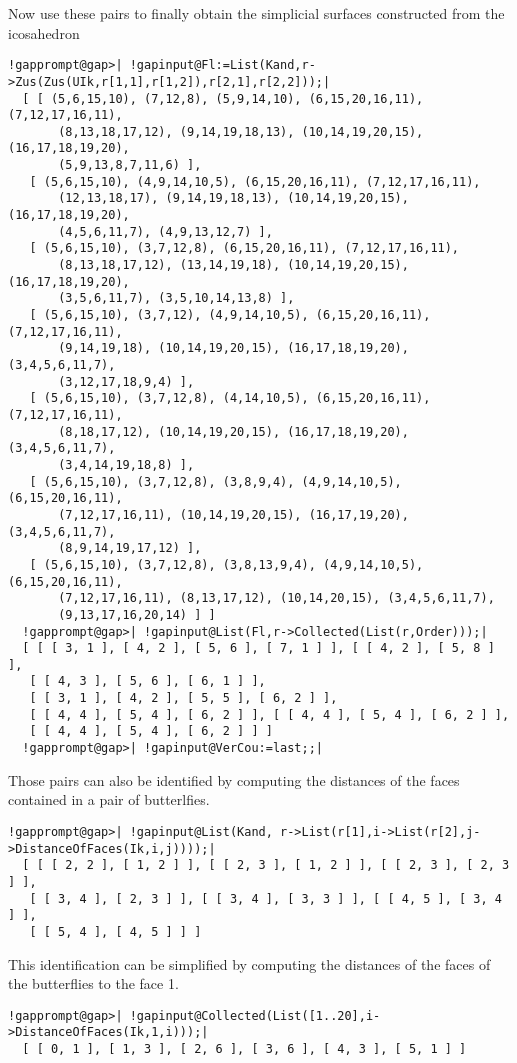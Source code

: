 \documentclass[a4paper,11pt]{report}
\begin{document}
{{ Now use these pairs to finally obtain the simplicial surfaces constructed from
the icosahedron 

 
\begin{Verbatim}[commandchars=!@|,fontsize=\small,frame=single,label=Example]
  !gapprompt@gap>| !gapinput@Fl:=List(Kand,r->Zus(Zus(UIk,r[1,1],r[1,2]),r[2,1],r[2,2]));|
  [ [ (5,6,15,10), (7,12,8), (5,9,14,10), (6,15,20,16,11), (7,12,17,16,11), 
       (8,13,18,17,12), (9,14,19,18,13), (10,14,19,20,15), (16,17,18,19,20), 
       (5,9,13,8,7,11,6) ], 
   [ (5,6,15,10), (4,9,14,10,5), (6,15,20,16,11), (7,12,17,16,11), 
       (12,13,18,17), (9,14,19,18,13), (10,14,19,20,15), (16,17,18,19,20), 
       (4,5,6,11,7), (4,9,13,12,7) ], 
   [ (5,6,15,10), (3,7,12,8), (6,15,20,16,11), (7,12,17,16,11), 
       (8,13,18,17,12), (13,14,19,18), (10,14,19,20,15), (16,17,18,19,20), 
       (3,5,6,11,7), (3,5,10,14,13,8) ], 
   [ (5,6,15,10), (3,7,12), (4,9,14,10,5), (6,15,20,16,11), (7,12,17,16,11), 
       (9,14,19,18), (10,14,19,20,15), (16,17,18,19,20), (3,4,5,6,11,7), 
       (3,12,17,18,9,4) ], 
   [ (5,6,15,10), (3,7,12,8), (4,14,10,5), (6,15,20,16,11), (7,12,17,16,11), 
       (8,18,17,12), (10,14,19,20,15), (16,17,18,19,20), (3,4,5,6,11,7), 
       (3,4,14,19,18,8) ], 
   [ (5,6,15,10), (3,7,12,8), (3,8,9,4), (4,9,14,10,5), (6,15,20,16,11), 
       (7,12,17,16,11), (10,14,19,20,15), (16,17,19,20), (3,4,5,6,11,7), 
       (8,9,14,19,17,12) ], 
   [ (5,6,15,10), (3,7,12,8), (3,8,13,9,4), (4,9,14,10,5), (6,15,20,16,11), 
       (7,12,17,16,11), (8,13,17,12), (10,14,20,15), (3,4,5,6,11,7), 
       (9,13,17,16,20,14) ] ]
  !gapprompt@gap>| !gapinput@List(Fl,r->Collected(List(r,Order)));|
  [ [ [ 3, 1 ], [ 4, 2 ], [ 5, 6 ], [ 7, 1 ] ], [ [ 4, 2 ], [ 5, 8 ] ], 
   [ [ 4, 3 ], [ 5, 6 ], [ 6, 1 ] ], 
   [ [ 3, 1 ], [ 4, 2 ], [ 5, 5 ], [ 6, 2 ] ], 
   [ [ 4, 4 ], [ 5, 4 ], [ 6, 2 ] ], [ [ 4, 4 ], [ 5, 4 ], [ 6, 2 ] ], 
   [ [ 4, 4 ], [ 5, 4 ], [ 6, 2 ] ] ]
  !gapprompt@gap>| !gapinput@VerCou:=last;;|
\end{Verbatim}
 

 Those pairs can also be identified by computing the distances of the faces
contained in a pair of butterlfies. 

 
\begin{Verbatim}[commandchars=!@|,fontsize=\small,frame=single,label=Example]
  !gapprompt@gap>| !gapinput@List(Kand, r->List(r[1],i->List(r[2],j->DistanceOfFaces(Ik,i,j))));|
  [ [ [ 2, 2 ], [ 1, 2 ] ], [ [ 2, 3 ], [ 1, 2 ] ], [ [ 2, 3 ], [ 2, 3 ] ], 
   [ [ 3, 4 ], [ 2, 3 ] ], [ [ 3, 4 ], [ 3, 3 ] ], [ [ 4, 5 ], [ 3, 4 ] ], 
   [ [ 5, 4 ], [ 4, 5 ] ] ]
\end{Verbatim}
 

 This identification can be simplified by computing the distances of the faces
of the butterflies to the face 1. 

 
\begin{Verbatim}[commandchars=!@|,fontsize=\small,frame=single,label=Example]
  !gapprompt@gap>| !gapinput@Collected(List([1..20],i->DistanceOfFaces(Ik,1,i)));|
  [ [ 0, 1 ], [ 1, 3 ], [ 2, 6 ], [ 3, 6 ], [ 4, 3 ], [ 5, 1 ] ]
\end{Verbatim}
 }

 }
\end{document}

